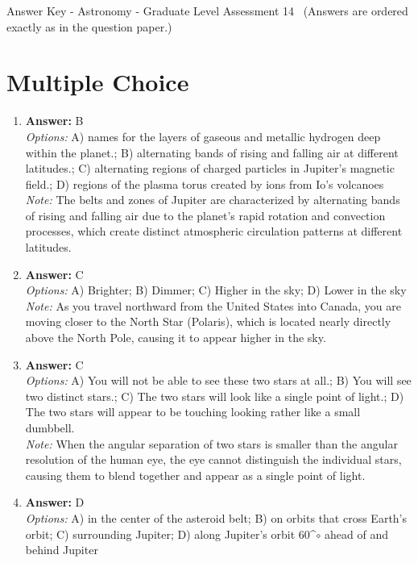 \documentclass[12pt]{article}
\begin{document}
\begin{center}
Answer Key - Astronomy - Graduate Level Assessment 14 \
\small (Answers are ordered exactly as in the question paper.)
\end{center}

\section*{Multiple Choice}
\begin{enumerate}[label=\arabic*.]
\item \textbf{Answer:} B
\\ \textit{Options:} A) names for the layers of gaseous and metallic hydrogen deep within the planet.; B) alternating bands of rising and falling air at different latitudes.; C) alternating regions of charged particles in Jupiter's magnetic field.; D) regions of the plasma torus created by ions from Io's volcanoes
\\ \textit{Note:} The belts and zones of Jupiter are characterized by alternating bands of rising and falling air due to the planet's rapid rotation and convection processes, which create distinct atmospheric circulation patterns at different latitudes.
\item \textbf{Answer:} C
\\ \textit{Options:} A) Brighter; B) Dimmer; C) Higher in the sky; D) Lower in the sky
\\ \textit{Note:} As you travel northward from the United States into Canada, you are moving closer to the North Star (Polaris), which is located nearly directly above the North Pole, causing it to appear higher in the sky.
\item \textbf{Answer:} C
\\ \textit{Options:} A) You will not be able to see these two stars at all.; B) You will see two distinct stars.; C) The two stars will look like a single point of light.; D) The two stars will appear to be touching looking rather like a small dumbbell.
\\ \textit{Note:} When the angular separation of two stars is smaller than the angular resolution of the human eye, the eye cannot distinguish the individual stars, causing them to blend together and appear as a single point of light.
\item \textbf{Answer:} D
\\ \textit{Options:} A) in the center of the asteroid belt; B) on orbits that cross Earth's orbit; C) surrounding Jupiter; D) along Jupiter's orbit 60^\ensuremath{\circ} ahead of and behind Jupiter

\end{enumerate}
\end{document}
